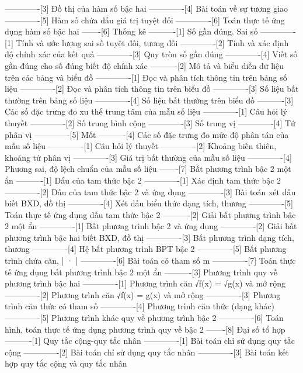 -------------[3] Đồ thị của hàm số bậc hai
-------------[4] Bài toán về sự tương giao
-------------[5] Hàm số chứa dấu giá trị tuyệt đối
-------------[6] Toán thực tế ứng dụng hàm số bậc hai
-------[6] Thống kê
----------[1] Số gần đúng. Sai số
-------------[1] Tính và ước lượng sai số tuyệt đối, tương đối
-------------[2] Tính và xác định độ chính xác của kết quả
-------------[3] Quy tròn số gần đúng
-------------[4] Viết số gần đúng cho số đúng biết độ chính xác
----------[2] Mô tả và biểu diễn dữ liệu trên các bảng và biểu đồ
-------------[1] Đọc và phân tích thông tin trên bảng số liệu
-------------[2] Đọc và phân tích thông tin trên biểu đồ
-------------[3] Số liệu bất thường trên bảng số liệu
-------------[4] Số liệu bất thường trên biểu đồ
----------[3] Các số đặc trưng đo xu thế trung tâm của mẫu số liệu
-------------[1] Câu hỏi lý thuyết
-------------[2] Số trung bình cộng
-------------[3] Số trung vị
-------------[4] Tứ phân vị
-------------[5] Mốt
----------[4] Các số đặc trưng đo mức độ phân tán của mẫu số liệu
-------------[1] Câu hỏi lý thuyết
-------------[2] Khoảng biến thiên, khoảng tứ phân vị
-------------[3] Giá trị bất thường của mẫu số liệu
-------------[4] Phương sai, độ lệch chuẩn của mẫu số liệu
-------[7] Bất phương trình bậc 2 một ẩn
----------[1] Dấu của tam thức bậc 2
-------------[1] Xác định tam thức bậc 2
-------------[2] Dấu của tam thức bậc 2 và ứng dụng
-------------[3] Bài toán xét dấu biết BXD, đồ thị
-------------[4] Xét dấu biểu thức dạng tích, thương
-------------[5] Toán thực tế ứng dụng dấu tam thức bậc 2
----------[2] Giải bất phương trình bậc 2 một ẩn
-------------[1] Bất phương trình bậc 2 và ứng dụng
-------------[2] Giải bất phương trình bậc hai biết BXD, đồ thị
-------------[3] Bất phương trình dạng tích, thương
-------------[4] Hệ bất phương trình BPT bậc 2
-------------[5] Bất phương trình chứa căn, | · |
-------------[6] Bài toán có tham số m
-------------[7] Toán thực tế ứng dụng bất phương trình bậc 2 một ẩn
----------[3] Phương trình quy về phương trình bậc hai
-------------[1] Phương trình căn √︀f(x) = √︀g(x) và mở rộng
-------------[2] Phương trình căn √︀f(x) = g(x) và mở rộng
-------------[3] Phương trình căn thức có tham số
-------------[4] Phương trình căn thức (dạng khác)
-------------[5] Phương trình khác quy về phương trình bậc 2
-------------[6] Toán hình, toán thực tế ứng dụng phương trình quy về bậc 2
-------[8] Đại số tổ hợp
----------[1] Quy tắc cộng-quy tắc nhân
-------------[1] Bài toán chỉ sử dụng quy tắc cộng
-------------[2] Bài toán chỉ sử dụng quy tắc nhân
-------------[3] Bài toán kết hợp quy tắc cộng và quy tắc nhân
